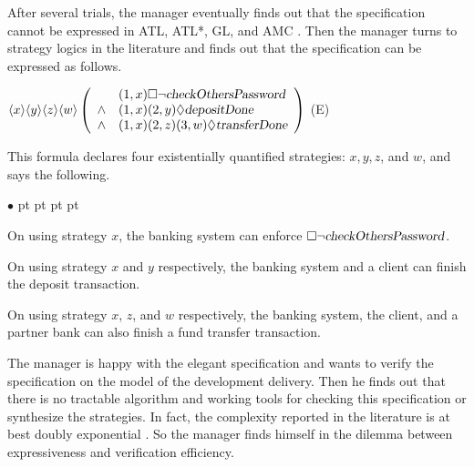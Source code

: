 \documentclass[11pt]{article}
\newcommand{\pfrr}{\Box}
\newcommand{\pevt}{\Diamond}
\newenvironment{list1}{\begin{list}{$\bullet$}
{\topsep 0 pt \parsep 0 pt \partopsep 0 pt \itemsep 0 pt}}{\end{list}}
\begin{document}
After several trials, the manager eventually finds out that 
the specification cannot be expressed in ATL, ATL*, GL, and AMC \cite{AHK02}.  
Then the manager turns to strategy logics \cite{CHP10,MMV10} in the literature and 
finds out that the specification can be expressed as follows. 
\begin{center} \hfill 
$\langle x\rangle \langle y\rangle\langle z\rangle \langle w\rangle \left(\begin{array}{cl}
		& (1,x)\pfrr\neg \mbox{\sl checkOthersPassword}\\
\wedge 	& (1,x)(2,y)\pevt \mbox{\sl depositDone} \\
\wedge  & (1,x)(2,z)(3,w)\pevt\mbox{\sl transferDone} 
\end{array}\right)$
\hfill (E) 
\end{center}   
This formula declares four existentially quantified strategies: $x,y,z$, and $w$,  
and says the following. 
\begin{list1} 
\item On using strategy $x$, the banking system can enforce $\pfrr\neg \mbox{\sl checkOthersPassword}$.  
\item On using strategy $x$ and $y$ respectively, the banking system and a client can 
  finish the deposit transaction.  
\item On using strategy $x$, $z$, and $w$ respectively, the banking system, the client, and 
  a partner bank can also finish a fund transfer transaction.  
\end{list1} 
The manager is happy with the elegant specification and wants to 
verify the specification on the model of the development delivery.  
Then he finds out that there is no tractable algorithm and 
working tools for checking this specification or synthesize the strategies. 
In fact, the complexity reported in the literature is at best doubly exponential \cite{CHP10,MMV10}. 
So the manager finds himself in the dilemma between expressiveness and verification efficiency.  
\end{document}
